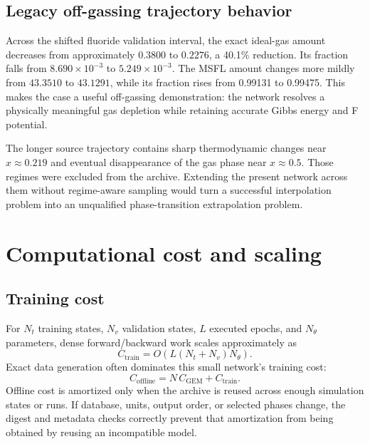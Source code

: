 \documentclass[11pt]{article}
\begin{document}
\subsection{Legacy off-gassing trajectory behavior}

Across the shifted fluoride validation interval, the exact ideal-gas amount decreases from
approximately \(0.3800\) to \(0.2276\), a 40.1\% reduction.  Its fraction falls from
\(8.690\times10^{-3}\) to \(5.249\times10^{-3}\).  The MSFL amount changes more mildly from
\(43.3510\) to \(43.1291\), while its fraction rises from 0.99131 to 0.99475.  This makes the case a
useful off-gassing demonstration: the network resolves a physically meaningful gas depletion
while retaining accurate Gibbs energy and F potential.

The longer source trajectory contains sharp thermodynamic changes near \(x\approx0.219\) and
eventual disappearance of the gas phase near \(x\approx0.5\).  Those regimes were excluded from
the archive.  Extending the present network across them without regime-aware sampling would turn a
successful interpolation problem into an unqualified phase-transition extrapolation problem.

\section{Computational cost and scaling}

\subsection{Training cost}

For \(N_t\) training states, \(N_v\) validation states, \(L\) executed epochs, and
\(N_{\theta}\) parameters, dense forward/backward work scales approximately as
\begin{equation}
  C_{\mathrm{train}}
  =O\left(L(N_t+N_v)N_{\theta}\right).
  \label{eq:training-cost}
\end{equation}
Exact data generation often dominates this small network's training cost:
\begin{equation}
  C_{\mathrm{offline}}
  =N\,C_{\mathrm{GEM}}+C_{\mathrm{train}}.
  \label{eq:offline-cost}
\end{equation}
Offline cost is amortized only when the archive is reused across enough simulation states or
runs.  If database, units, output order, or selected phases change, the digest and metadata checks
correctly prevent that amortization from being obtained by reusing an incompatible model.
\end{document}
